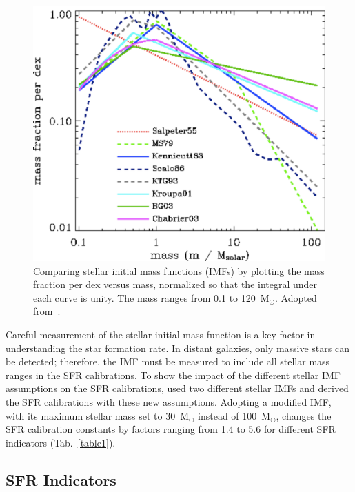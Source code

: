 \begin{figure}
\label{fig: imf}
\centering
\includegraphics[width=16cm]{../image_intro/imf}
\small
\caption{Comparing stellar initial mass functions (IMFs) by plotting the mass fraction per dex versus mass, normalized so that the integral under each curve is unity. The mass ranges from 0.1 to 120~M$_\odot$. Adopted from~\cite{Baldry03}.} %
\end{figure}


Careful measurement of the stellar initial mass function is a key factor in understanding the star formation rate. 
In distant galaxies, only massive stars can be detected; therefore, the IMF must be measured to include all stellar mass ranges in the SFR calibrations. %
To show the impact of the different stellar IMF assumptions on the SFR calibrations, \cite{Calzetti13} used two different stellar IMFs and derived the SFR calibrations with these new assumptions.
Adopting a modified \cite{Kroupa01} IMF, with its maximum stellar mass set to 30~M$_{\odot}$ instead of 100~M$_{\odot}$, changes the SFR calibration constants by factors ranging from 1.4 to 5.6 for different SFR indicators (Tab.~\ref{table1}). 

\subsection{SFR Indicators}

